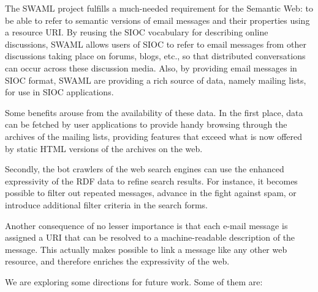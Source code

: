 \documentclass{llncs}
\begin{document}
The SWAML project fulfills a much-needed requirement for the Semantic Web: 
to be able to refer to semantic versions of email messages and their 
properties using a resource URI. By reusing the SIOC vocabulary for describing
online discussions, SWAML allows users of SIOC to refer to email messages 
from other discussions taking place on forums, blogs, etc., so that distributed 
conversations can occur across these discussion media. Also, by providing email 
messages in SIOC format, SWAML are providing a rich source of data, namely 
mailing lists, for use in SIOC applications.

Some benefits arouse from the availability of these data. In the first
place, data can be fetched by user applications to provide handy browsing
through the archives of the mailing lists, providing features that
exceed what is now offered by static HTML versions of the archives on
the web.

Secondly, the bot crawlers of the web search engines can use the enhanced
expressivity of the RDF data to refine search results. For instance, it
becomes possible to filter out repeated messages, advance in the fight against
spam, or introduce additional filter criteria in the search forms.

Another consequence of no lesser importance is that each e-mail message
is assigned a URI that can be resolved to a machine-readable description
of the message. This actually makes possible to link a message like
any other web resource, and therefore enriches the expressivity of the
web.

We are exploring some directions for future work. Some of them are:
\end{document}
